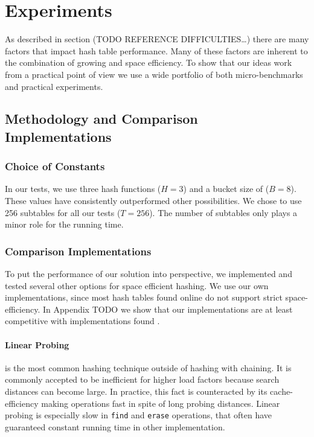 \documentclass[a4paper,UKenglish]{lipics-v2016}
\begin{document}
\section{Experiments}
As described in section (TODO REFERENCE DIFFICULTIES\ldots{}) there are
many factors that impact hash table performance.  Many of these
factors are inherent to the combination of growing and space
efficiency.  To show that our ideas work from a practical point of
view we use a wide portfolio of both micro-benchmarks and practical
experiments.

\subsection{Methodology and Comparison Implementations}

\subsubsection*{Choice of Constants}
In our tests, we use three hash functions ($H=3$) and a bucket size of
($B=8$). These values have consistently outperformed other
possibilities.  We chose to use 256 subtables for all our tests
($T=256$).  The number of subtables only plays a minor role for the
running time.

\subsubsection*{Comparison Implementations}
To put the performance of our solution into perspective, we
implemented and tested several other options for space efficient
hashing.  We use our own implementations, since most hash tables found
online do not support strict space-efficiency.  In Appendix TODO we
show that our implementations are at least competitive with
implementations found .

\paragraph*{Linear Probing} is the most common hashing technique outside of
hashing with chaining.  It is commonly accepted to be inefficient for
higher load factors because search distances can become large.  In
practice, this fact is counteracted by its cache-efficiency making
operations fast in spite of long probing distances.  Linear probing is
especially slow in \verb~find~ and \verb~erase~ operations, that often have
guaranteed constant running time in other implementation.
\end{document}
